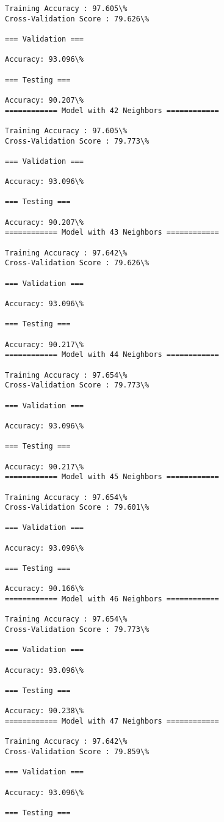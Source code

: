 \documentclass[11pt]{article}
\begin{document}
\begin{Verbatim}[commandchars=\\\{\}]
Training Accuracy : 97.605\%
Cross-Validation Score : 79.626\%

=== Validation ===

Accuracy: 93.096\%

=== Testing ===

Accuracy: 90.207\%
============ Model with 42 Neighbors ============

Training Accuracy : 97.605\%
Cross-Validation Score : 79.773\%

=== Validation ===

Accuracy: 93.096\%

=== Testing ===

Accuracy: 90.207\%
============ Model with 43 Neighbors ============

Training Accuracy : 97.642\%
Cross-Validation Score : 79.626\%

=== Validation ===

Accuracy: 93.096\%

=== Testing ===

Accuracy: 90.217\%
============ Model with 44 Neighbors ============

Training Accuracy : 97.654\%
Cross-Validation Score : 79.773\%

=== Validation ===

Accuracy: 93.096\%

=== Testing ===

Accuracy: 90.217\%
============ Model with 45 Neighbors ============

Training Accuracy : 97.654\%
Cross-Validation Score : 79.601\%

=== Validation ===

Accuracy: 93.096\%

=== Testing ===

Accuracy: 90.166\%
============ Model with 46 Neighbors ============

Training Accuracy : 97.654\%
Cross-Validation Score : 79.773\%

=== Validation ===

Accuracy: 93.096\%

=== Testing ===

Accuracy: 90.238\%
============ Model with 47 Neighbors ============

Training Accuracy : 97.642\%
Cross-Validation Score : 79.859\%

=== Validation ===

Accuracy: 93.096\%

=== Testing ===


\end{Verbatim}
\end{document}

